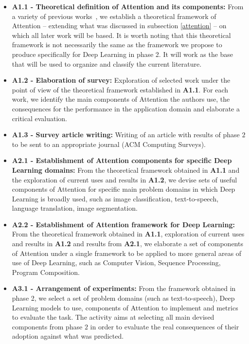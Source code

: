 \documentclass[12pt]{article}
\begin{document}
\begin{itemize}
    \item \textbf{A1.1 - Theoretical definition of Attention and its components:}
        From a variety of previous works~\cite{ref:helgason}\cite{ref:esther-thesis},
        we establish a theoretical framework of Attention
        -- extending what was discussed in subsection \ref{attention} --
        on which all later work will be based.
        It is worth noting that this theoretical framework is not necessarily the same as the framework
        we propose to produce specifically for Deep Learning in phase 2. It will work as the base that will be used to organize and classify the current literature.

    \item \textbf{A1.2 - Elaboration of survey:}
        Exploration of selected work under the point of view of the theoretical framework established
        in \textbf{A1.1}.
        For each work, we identify the main components of Attention the authors use, the consequences for the
        performance in the application domain and elaborate a critical evaluation.

    \item \textbf{A1.3 - Survey article writing:}
        Writing of an article with results of phase $2$ to be sent to an appropriate journal (ACM Computing Surveys).

    \item \textbf{A2.1 - Establishment of Attention components for specific Deep Learning domains:}
        From the theoretical framework obtained in \textbf{A1.1}
        and the exploration of current uses and results in \textbf{A1.2},
        we devise sets of useful components of Attention for specific main problem domains
        in which Deep Learning is broadly used,
        such as image classification, text-to-speech, language translation, image segmentation.

    \item \textbf{A2.2 - Establishment of Attention framework for Deep Learning:}
        From the theoretical framework obtained in \textbf{A1.1},
        exploration of current uses and results in \textbf{A1.2} and
        results from \textbf{A2.1},
        we elaborate a set of components of Attention under a single framework to be applied to more
        general areas of use of Deep Learning,
        such as Computer Vision, Sequence Processing, Program Composition.

    \item \textbf{A3.1 - Arrangement of experiments:}
        From the framework obtained in phase 2, we select a set of problem domains (such as text-to-speech),
        Deep Learning models to use, components of Attention to implement and metrics to evaluate the task.
        The activity aims at selecting all main devised components from phase $2$ in order
        to evaluate the real consequences of their adoption against what was predicted.


\end{itemize}
\end{document}
